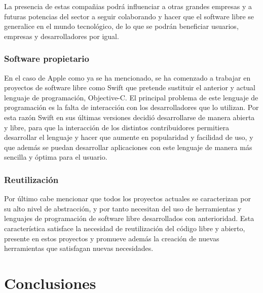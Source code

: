 \documentclass[a4paper, spanish, 12pt]{book}
\begin{document}
La presencia de estas compa\~nias podr\'a influenciar a otras grandes empresas y a futuras potencias del sector
a seguir colaborando y hacer que el software libre se generalice en el mundo tecnol\'ogico, de lo que se podr\'an
beneficiar usuarios, empresas y desarrolladores por igual.

\subsection*{Software propietario}
\label{subsec:propietary_sw}

En el caso de Apple como ya se ha mencionado, se ha comenzado a trabajar en proyectos de software libre
como Swift que pretende sustituir el anterior y actual lenguaje de programaci\'on, Objective-C. El principal problema
de este lenguaje de programaci\'on es la falta de interacci\'on con los desarrolladores que lo utilizan.
Por esta raz\'on Swift en sus \'ultimas versiones decidi\'o desarrollarse de manera abierta y libre, para que la interacci\'on
de los distintos contribuidores permitiera desarrollar el lenguaje y hacer que aumente en popularidad y facilidad de uso,
y que adem\'as se puedan desarrollar aplicaciones con este lenguaje de manera m\'as sencilla y \'optima para el usuario.

\subsection*{Reutilizaci\'on}
\label{subsec:reutilizacion}

Por \'ultimo cabe mencionar que todos los proyectos actuales se caracterizan por su alto nivel de abstracci\'on, y por
tanto necesitan del uso de herramientas y lenguajes de programaci\'on de software libre desarrollados con anterioridad.
Esta caracter\'istica satisface la necesidad de reutilizaci\'on del c\'odigo libre y abierto, presente en estos proyectos
y promueve adem\'as la creaci\'on de nuevas herramientas que satisfagan nuevas necesidades.



\cleardoublepage
\chapter{Conclusiones}
\label{chap:conclusiones}
\end{document}
